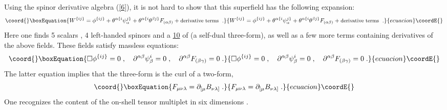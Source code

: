 \documentclass[a4paper,12pt]{article}
\begin{document}
Using the spinor derivative algebra (\ref{6}), it is not hard to 
show that this superfield has the following \myHighlight{$\theta$}\coordHE{} expansion: 
\begin{equation}\coord{}\boxEquation{\label{9}
  W^{\{ij\}} = \phi^{\{ij\}} + \theta^{\alpha\{i}\psi^{j\}}_\alpha 
+ \theta^{\alpha\{i} \theta^{\beta j\}} F_{(\alpha\beta)} + 
\mbox{\small derivative terms }\;. 
}{W^{\{ij\}} = \phi^{\{ij\}} + \theta^{\alpha\{i}\psi^{j\}}_\alpha 
+ \theta^{\alpha\{i} \theta^{\beta j\}} F_{(\alpha\beta)} + 
\mbox{\small derivative terms }\;. 
}{ecuacion}\coordE{}\end{equation}
Here one finds 5 scalars \coordHE{}, 4 left-handed spinors 
\coordHE{} and a  \underline{10} of \coordHE{} 
\coordHE{} (a self-dual three-form), as well as a few more 
terms containing derivatives of the above fields. These fields 
satisfy massless equations: 
\begin{equation}\coord{}\boxEquation{\label{10}
  \square\phi^{\{ij\}} = 0\;, \quad 
\partial^{\alpha\beta}\psi^i_\beta = 0\;, \quad 
\partial^{\alpha\beta} F_{(\beta\gamma)}=0\;.
}{\square\phi^{\{ij\}} = 0\;, \quad 
\partial^{\alpha\beta}\psi^i_\beta = 0\;, \quad 
\partial^{\alpha\beta} F_{(\beta\gamma)}=0\;.
}{ecuacion}\coordE{}\end{equation}
The latter equation implies that the three-form 
\coordHE{} is the curl of a two-form,
\begin{equation}\coord{}\boxEquation{\label{11}
  F_{\mu\nu\lambda} = \partial_{[\mu}B_{\nu\lambda]}\;.
}{F_{\mu\nu\lambda} = \partial_{[\mu}B_{\nu\lambda]}\;.
}{ecuacion}\coordE{}\end{equation}
One recognizes the content of the on-shell tensor \coordHE{} 
multiplet in six dimensions \cite{HSiT,bsvp}. 
\end{document}
